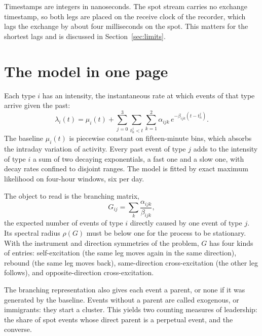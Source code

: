\documentclass[a4paper,11pt]{article}
\begin{document}
Timestamps are integers in nanoseconds. The spot stream carries no exchange timestamp, so both legs are placed on the receive clock of the recorder, which lags the exchange by about four milliseconds on the spot. This matters for the shortest lags and is discussed in Section~\ref{sec:limits}.

\section{The model in one page}

Each type $i$ has an intensity, the instantaneous rate at which events of that type arrive given the past:
\begin{equation}\label{eq:hawkes}
\lambda_i(t) = \mu_i(t) + \sum_{j=0}^{3} \sum_{t^j_n < t} \sum_{k=1}^{2} \alpha_{ijk}\, e^{-\beta_{ijk}(t - t^j_n)} .
\end{equation}
The baseline $\mu_i(t)$ is piecewise constant on fifteen-minute bins, which absorbs the intraday variation of activity. Every past event of type $j$ adds to the intensity of type $i$ a sum of two decaying exponentials, a fast one and a slow one, with decay rates confined to disjoint ranges. The model is fitted by exact maximum likelihood on four-hour windows, six per day.

The object to read is the branching matrix,
\begin{equation}\label{eq:G}
G_{ij} = \sum_{k} \frac{\alpha_{ijk}}{\beta_{ijk}},
\end{equation}
the expected number of events of type $i$ directly caused by one event of type $j$. Its spectral radius $\rho(G)$ must be below one for the process to be stationary. With the instrument and direction symmetries of the problem, $G$ has four kinds of entries: self-excitation (the same leg moves again in the same direction), rebound (the same leg moves back), same-direction cross-excitation (the other leg follows), and opposite-direction cross-excitation.

The branching representation also gives each event a parent, or none if it was generated by the baseline. Events without a parent are called exogenous, or immigrants: they start a cluster. This yields two counting measures of leadership: the share of spot events whose direct parent is a perpetual event, and the converse.
\end{document}

